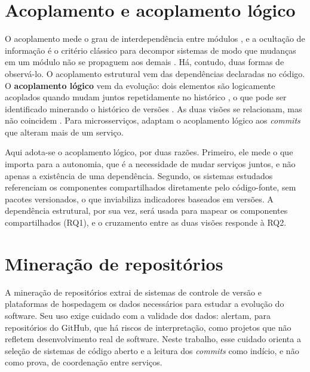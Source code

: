 \section{Acoplamento e acoplamento lógico}

O acoplamento mede o grau de interdependência entre módulos \cite{stevens1974}, e a ocultação de informação é o critério clássico para decompor sistemas de modo que mudanças em um módulo não se propaguem aos demais \cite{parnas1972}. Há, contudo, duas formas de observá-lo. O acoplamento estrutural vem das dependências declaradas no código. O \textbf{acoplamento lógico} vem da evolução: dois elementos são logicamente acoplados quando mudam juntos repetidamente no histórico \cite{gall1998}, o que pode ser identificado minerando o histórico de versões \cite{zimmermann2005}. As duas visões se relacionam, mas não coincidem \cite{ajienka2017}. Para microsserviços,  adaptam o acoplamento lógico aos \textit{commits} que alteram mais de um serviço.

Aqui adota-se o acoplamento lógico, por duas razões. Primeiro, ele mede o que importa para a autonomia, que é a necessidade de mudar serviços juntos, e não apenas a existência de uma dependência. Segundo, os sistemas estudados referenciam os componentes compartilhados diretamente pelo código-fonte, sem pacotes versionados, o que inviabiliza indicadores baseados em versões. A dependência estrutural, por sua vez, será usada para mapear os componentes compartilhados (RQ1), e o cruzamento entre as duas visões responde à RQ2.

\section{Mineração de repositórios}

A mineração de repositórios extrai de sistemas de controle de versão e plataformas de hospedagem os dados necessários para estudar a evolução do software. Seu uso exige cuidado com a validade dos dados:  alertam, para repositórios do GitHub, que há riscos de interpretação, como projetos que não refletem desenvolvimento real de software. Neste trabalho, esse cuidado orienta a seleção de sistemas de código aberto e a leitura dos \textit{commits} como indício, e não como prova, de coordenação entre serviços.
